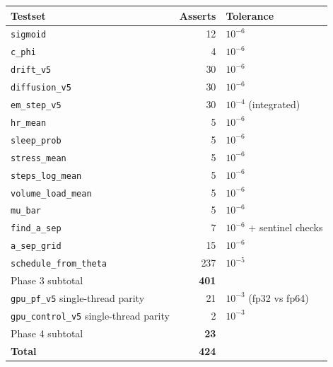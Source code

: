 \documentclass[11pt,a4paper]{article}
\begin{document}
\begin{center}\footnotesize
\begin{tabular}{p{40mm}rl}
\toprule
Testset                          & Asserts & Tolerance \\
\midrule
\texttt{sigmoid}                 & 12 & $10^{-6}$ \\
\texttt{c\_phi}                  &  4 & $10^{-6}$ \\
\texttt{drift\_v5}               & 30 & $10^{-6}$ \\
\texttt{diffusion\_v5}           & 30 & $10^{-6}$ \\
\texttt{em\_step\_v5}            & 30 & $10^{-4}$ (integrated) \\
\texttt{hr\_mean}                &  5 & $10^{-6}$ \\
\texttt{sleep\_prob}             &  5 & $10^{-6}$ \\
\texttt{stress\_mean}            &  5 & $10^{-6}$ \\
\texttt{steps\_log\_mean}        &  5 & $10^{-6}$ \\
\texttt{volume\_load\_mean}      &  5 & $10^{-6}$ \\
\texttt{mu\_bar}                 &  5 & $10^{-6}$ \\
\texttt{find\_a\_sep}            &  7 & $10^{-6}$ + sentinel checks \\
\texttt{a\_sep\_grid}            & 15 & $10^{-6}$ \\
\texttt{schedule\_from\_theta}   & 237 & $10^{-5}$ \\
\midrule
Phase 3 subtotal                  & \textbf{401} & \\
\midrule
\texttt{gpu\_pf\_v5} single-thread parity      & 21 & $10^{-3}$ (fp32 vs fp64) \\
\texttt{gpu\_control\_v5} single-thread parity &  2 & $10^{-3}$ \\
\midrule
Phase 4 subtotal                  & \textbf{23} & \\
\midrule
\textbf{Total}                    & \textbf{424} & \\
\bottomrule
\end{tabular}
\end{center}
\end{document}
